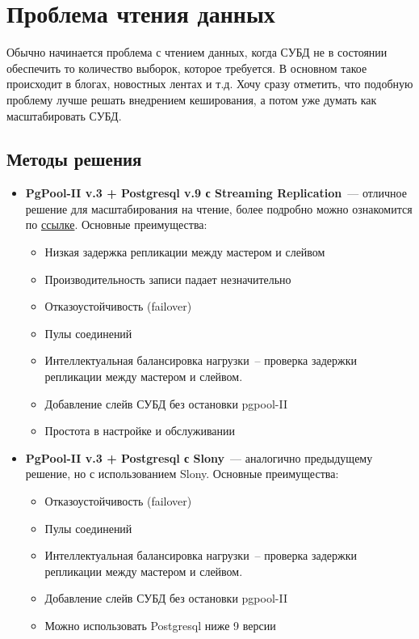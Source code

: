 \section{Проблема чтения данных}

Обычно начинается проблема с чтением данных, когда СУБД не в состоянии обеспечить то количество выборок, которое требуется. 
В основном такое происходит в блогах, новостных лентах и т.д. Хочу сразу отметить, что подобную проблему лучше решать 
внедрением кеширования, а потом уже думать как масштабировать СУБД.

\subsection{Методы решения}

\begin{itemize}
\item \textbf{PgPool-II v.3 + Postgresql v.9 с Streaming Replication}~--- отличное решение для масштабирования на чтение, 
более подробно можно ознакомится по \href{http://pgpool.projects.pgfoundry.org/contrib\_docs/simple\_sr\_setting/index.html}{ссылке}. 
Основные преимущества:
\begin{itemize}
\item Низкая задержка репликации между мастером и слейвом
\item Производительность записи падает незначительно
\item Отказоустойчивость (failover)
\item Пулы соединений
\item Интеллектуальная балансировка нагрузки~-- проверка задержки репликации между мастером и слейвом.
\item Добавление слейв СУБД без остановки pgpool-II
\item Простота в настройке и обслуживании
\end{itemize}

\item \textbf{PgPool-II v.3 + Postgresql с Slony}~--- аналогично предыдущему решение, но с использованием Slony.
Основные преимущества:
\begin{itemize}
\item Отказоустойчивость (failover)
\item Пулы соединений
\item Интеллектуальная балансировка нагрузки~-- проверка задержки репликации между мастером и слейвом.
\item Добавление слейв СУБД без остановки pgpool-II
\item Можно использовать Postgresql ниже 9 версии
\end{itemize}
\end{itemize}
